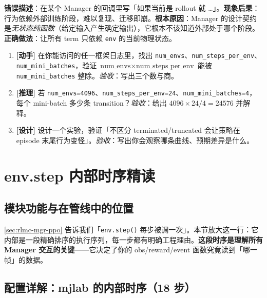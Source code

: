 \begin{pitfall}
\textbf{错误描述}：在某个 Manager 的回调里写「如果当前是 rollout 就 \dots」。\textbf{现象后果}：行为依赖外部训练阶段，难以复现、迁移即崩。\textbf{根本原因}：Manager 的设计契约是\emph{无状态纯函数}（给定输入产生确定输出），它根本不该知道外部处于哪个阶段。\textbf{正确做法}：让所有 term 只依赖 \verb|env| 的当前物理状态。
\end{pitfall}

\begin{practice}[本节练习]
\begin{enumerate}
  \item \textbf{[动手]} 在你能访问的任一框架日志里，找出 \verb|num_envs|、\verb|num_steps_per_env|、\verb|num_mini_batches|，验证 $\text{num\_envs}\times\text{num\_steps\_per\_env}$ 能被 \verb|num_mini_batches| 整除。\emph{验收}：写出三个数与商。
  \item \textbf{[推理]} 若 \verb|num_envs=4096|、\verb|num_steps_per_env=24|、\verb|num_mini_batches=4|，每个 mini-batch 多少条 transition？\emph{验收}：给出 $4096\times24/4=24576$ 并解释。
  \item \textbf{[设计]} 设计一个实验，验证「不区分 terminated/truncated 会让策略在 episode 末尾行为变怪」。\emph{验收}：写出你会观察哪条曲线、预期差异是什么。
\end{enumerate}
\end{practice}

\section{env.step 内部时序精读}
\label{sec:rlmc-mgr-step}

\subsection{模块功能与在管线中的位置}

\cref{sec:rlmc-mgr-ppo} 告诉我们「\verb|env.step()| 每步被调一次」。本节放大这一行：它内部是一段精确排序的执行序列，每一步都有明确工程理由。\textbf{这段时序是理解所有 Manager 交互的关键}——它决定了你的 obs/reward/event 函数究竟读到「哪一帧」的数据。

\subsection{配置详解：mjlab 的内部时序（18 步）}
\label{sec:rlmc-mgr-step18}

